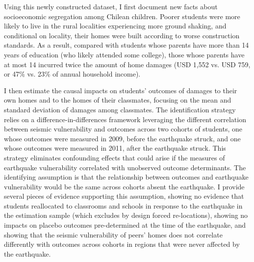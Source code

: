 Using this newly constructed dataset, I first document new facts about socioeconomic segregation among Chilean children. Poorer students were more likely to live in the rural localities experiencing more ground shaking, and conditional on locality, their homes were built according to worse construction standards. As a result, compared with students whose parents have more than 14 years of education (who likely attended some college), those whose parents have at most 14 incurred twice the amount of home damages (USD 1,552 vs. USD 759, or 47\% vs. 23\% of annual household income). \par 

I then estimate the causal impacts on students' outcomes of damages to their own homes and to the homes of their classmates, focusing on the mean and standard deviation of damages among classmates. The identification strategy relies on a difference-in-differences framework leveraging the different correlation between seismic vulnerability and outcomes across two cohorts of students, one whose outcomes were measured in 2009, before the earthquake struck, and one whose outcomes were measured in 2011, after the earthquake struck. This strategy eliminates confounding effects that could arise if the measures of earthquake vulnerability correlated with unobserved outcome determinants. The identifying assumption is that the relationship between outcomes and earthquake vulnerability would be the same across cohorts absent the earthquake. I provide several pieces of evidence supporting this assumption, showing no evidence that students reallocated to classrooms and schools in response to the earthquake in the estimation sample (which excludes by design forced re-locations), showing no impacts on placebo outcomes pre-determined at the time of the earthquake, and showing that the seismic vulnerability of peers' homes does not correlate differently with outcomes across cohorts in regions that were never affected by the earthquake.\par 

